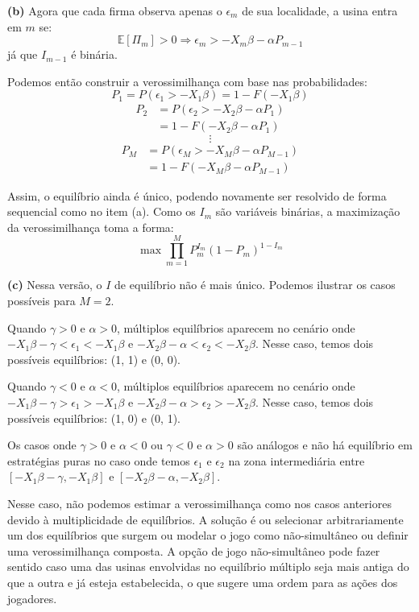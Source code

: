 \documentclass[
  12pt,
]{article}
\begin{document}
\textbf{(b)} Agora que cada firma observa apenas o \(\epsilon_m\) de sua
localidade, a usina entra em \(m\) se: \[
\mathbb{E}[\Pi_m] > 0 \Rightarrow \epsilon_m > -X_m \beta - \alpha P_{m-1}
\] já que \(I_{m-1}\) é binária.

Podemos então construir a verossimilhança com base nas probabilidades:
\[
P_1 = P(\epsilon_1 > -X_1 \beta) = 1 - F(-X_1 \beta)
\] \begin{align*}
    P_2 &= P(\epsilon_2 > -X_2 \beta - \alpha P_1) \\        
  &= 1 - F(-X_2 \beta - \alpha P_1)
\end{align*} \[
\vdots
\] \begin{align*}
    P_M &= P(\epsilon_M > -X_M \beta - \alpha P_{M-1}) \\        
  &= 1 - F(-X_M \beta - \alpha P_{M-1})
\end{align*}

Assim, o equilíbrio ainda é único, podendo novamente ser resolvido de
forma sequencial como no item (a). Como os \(I_m\) são variáveis
binárias, a maximização da verossimilhança toma a forma: \[
\max \prod_{m=1}^{M} P_{m}^{I_{m}}\left(1-P_{m}\right)^{1-I_{m}}
\]

\textbf{(c)} Nessa versão, o \(I\) de equilíbrio não é mais único.
Podemos ilustrar os casos possíveis para \(M=2\).

Quando \(\gamma > 0\) e \(\alpha > 0\), múltiplos equilíbrios aparecem
no cenário onde \(-X_1 \beta - \gamma < \epsilon_1 < -X_1 \beta\) e
\(-X_2 \beta - \alpha < \epsilon_2 < -X_2 \beta\). Nesse caso, temos
dois possíveis equilíbrios: (1, 1) e (0, 0).

Quando \(\gamma < 0\) e \(\alpha < 0\), múltiplos equilíbrios aparecem
no cenário onde \(-X_1 \beta - \gamma > \epsilon_1 > -X_1 \beta\) e
\(-X_2 \beta - \alpha > \epsilon_2 > -X_2 \beta\). Nesse caso, temos
dois possíveis equilíbrios: (1, 0) e (0, 1).

Os casos onde \(\gamma > 0\) e \(\alpha < 0\) ou \(\gamma < 0\) e
\(\alpha > 0\) são análogos e não há equilíbrio em estratégias puras no
caso onde temos \(\epsilon_1\) e \(\epsilon_2\) na zona intermediária
entre \([-X_1 \beta - \gamma, -X_1 \beta]\) e
\([-X_2 \beta - \alpha, -X_2 \beta]\).

Nesse caso, não podemos estimar a verossimilhança como nos casos
anteriores devido à multiplicidade de equilíbrios. A solução é ou
selecionar arbitrariamente um dos equilíbrios que surgem ou modelar o
jogo como não-simultâneo ou definir uma verossimilhança composta. A
opção de jogo não-simultâneo pode fazer sentido caso uma das usinas
envolvidas no equilíbrio múltiplo seja mais antiga do que a outra e já
esteja estabelecida, o que sugere uma ordem para as ações dos jogadores.
\end{document}
